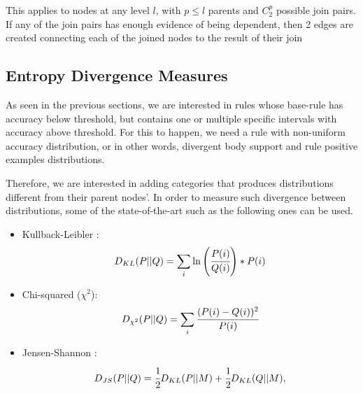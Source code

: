 \begin{comment}
In level 1 from \graphname, nodes can be directly pruned, on the other hand, for further levels, for a node to be
pruned by independence, all the possible joins resulting the node must be independent. In level 2, for example, in order
to prune the node $r a_1 b_1 c_1$, given that in level 1 the nodes $r a_1 b_1$, $r a_1 c_1$ and $r b_1 c_1$ were not
pruned. All the three possible join combinations should fail the independence test, i.e.:

\begin{equation}
\begin{split} 
  freq(r a_1 b_1 c_1) &\approx freq(r a_1)p (r b_1|r a_1) p(r c_1|r a_1) \\ 
  &\approx  freq(r b_1) p(r a_1|r b_1) p(r c_1|r b_1) \\ 
  &\approx  freq(r c_1) p(r a_1|r c_1) p(r b_1|r c_1)  
\end{split}
\end{equation}
\end{comment}

This applies to nodes at any level $l$, with $p \leq l$ parents and $C_{2}^{p}$ possible join pairs. If any of the join
pairs has enough evidence of being dependent, then 2 edges are created connecting each of the joined
nodes to the result of their join

\subsection{Entropy Divergence Measures}

As seen in the previous sections, we are interested in rules whose base-rule has accuracy below threshold, but contains
one or multiple specific intervals with accuracy above threshold. For this to happen, we need a rule with non-uniform
accuracy distribution, or in other words, divergent body support and rule positive examples distributions.

Therefore, we are interested in adding categories that produces distributions different from their parent nodes'. In
order to measure such divergence between distributions, some of the state-of-the-art such as the following ones can be
used.

\begin{itemize}
 \item Kullback-Leibler \cite{Kullback51klDivergence}: 
    \begin{equation}
      D_{KL}(P||Q)=\sum_{\substack{i}}\ln\left(\cfrac{P(i)}{Q(i)}\right)*P(i)
    \end{equation}
 \item Chi-squared ($\chi^2$):
    \begin{equation}
      D_{\chi^2}(P||Q)=\sum_{\substack{i}}\cfrac{(P(i)-Q(i))^2}{P(i)}
    \end{equation}
 \item Jensen-Shannon \cite{17795}:
    \begin{equation}
      D_{JS}(P||Q)=\cfrac{1}{2}D_{KL}(P||M)+\cfrac{1}{2}D_{KL}(Q||M), 
    \end{equation}
\end{itemize}

